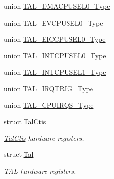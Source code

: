 \begin{DoxyCompactItemize}
\item 
union \hyperlink{union_t_a_l___d_m_a_c_p_u_s_e_l0___type}{T\+A\+L\+\_\+\+D\+M\+A\+C\+P\+U\+S\+E\+L0\+\_\+\+Type}
\item 
union \hyperlink{union_t_a_l___e_v_c_p_u_s_e_l0___type}{T\+A\+L\+\_\+\+E\+V\+C\+P\+U\+S\+E\+L0\+\_\+\+Type}
\item 
union \hyperlink{union_t_a_l___e_i_c_c_p_u_s_e_l0___type}{T\+A\+L\+\_\+\+E\+I\+C\+C\+P\+U\+S\+E\+L0\+\_\+\+Type}
\item 
union \hyperlink{union_t_a_l___i_n_t_c_p_u_s_e_l0___type}{T\+A\+L\+\_\+\+I\+N\+T\+C\+P\+U\+S\+E\+L0\+\_\+\+Type}
\item 
union \hyperlink{union_t_a_l___i_n_t_c_p_u_s_e_l1___type}{T\+A\+L\+\_\+\+I\+N\+T\+C\+P\+U\+S\+E\+L1\+\_\+\+Type}
\item 
union \hyperlink{union_t_a_l___i_r_q_t_r_i_g___type}{T\+A\+L\+\_\+\+I\+R\+Q\+T\+R\+I\+G\+\_\+\+Type}
\item 
union \hyperlink{union_t_a_l___c_p_u_i_r_q_s___type}{T\+A\+L\+\_\+\+C\+P\+U\+I\+R\+Q\+S\+\_\+\+Type}
\item 
struct \hyperlink{struct_tal_ctis}{Tal\+Ctis}
\begin{DoxyCompactList}\small\item\em \hyperlink{struct_tal_ctis}{Tal\+Ctis} hardware registers. \end{DoxyCompactList}\item 
struct \hyperlink{struct_tal}{Tal}
\begin{DoxyCompactList}\small\item\em T\+A\+L hardware registers. \end{DoxyCompactList}\end{DoxyCompactItemize}
